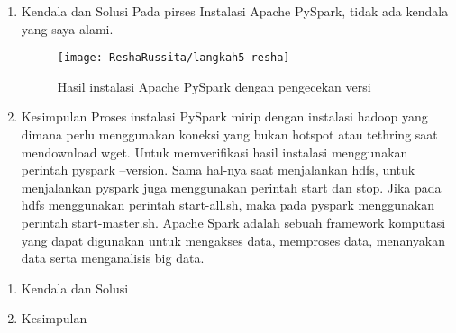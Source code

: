\begin{enumerate}
\item Kendala dan Solusi
\newline Pada pirses Instalasi Apache PySpark, tidak ada kendala yang saya alami.

\begin{figure}[!ht]
\texttt{[image: ReshaRussita/langkah5-resha]}
\caption{Hasil instalasi Apache PySpark dengan pengecekan versi}
\label{gam:perkuliahan-16-12}
\end{figure}

\item Kesimpulan
\newline Proses instalasi PySpark mirip dengan instalasi hadoop yang dimana perlu menggunakan koneksi yang bukan hotspot atau tethring saat mendownload wget. Untuk memverifikasi hasil instalasi menggunakan perintah pyspark --version. Sama hal-nya saat menjalankan hdfs, untuk menjalankan pyspark juga menggunakan perintah start dan stop. Jika pada hdfs menggunakan perintah start-all.sh, maka pada pyspark menggunakan perintah start-master.sh. Apache Spark adalah sebuah framework komputasi yang dapat digunakan untuk mengakses data, memproses data, menanyakan data serta menganalisis big data. 

\end{enumerate}

\begin{enumerate}
\item Kendala dan Solusi

\item Kesimpulan

\end{enumerate}
